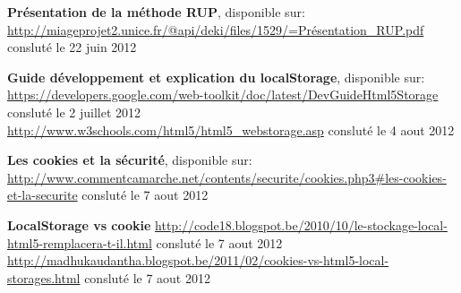 \begin{thebibliography}{99}
\bibitem{}\textbf{Présentation de la méthode RUP}, disponible sur: \newline
\url{http://miageprojet2.unice.fr/@api/deki/files/1529/=Présentation_RUP.pdf} consluté le 22 juin 2012

\bibitem{}\textbf{Guide développement et explication du localStorage}, disponible sur: \newline
\url{https://developers.google.com/web-toolkit/doc/latest/DevGuideHtml5Storage} consluté le 2 juillet 2012 \\
\url{http://www.w3schools.com/html5/html5_webstorage.asp} consluté le 4 aout 2012

\bibitem{}\textbf{Les cookies et la sécurité}, disponible sur: \newline
\url{http://www.commentcamarche.net/contents/securite/cookies.php3#les-cookies-et-la-securite} consluté le 7 aout 2012 

\bibitem{}\textbf{LocalStorage vs cookie} \newline
\url{http://code18.blogspot.be/2010/10/le-stockage-local-html5-remplacera-t-il.html} consluté le 7 aout 2012
\url{http://madhukaudantha.blogspot.be/2011/02/cookies-vs-html5-local-storages.html} consluté le 7 aout 2012

\end{thebibliography} 
